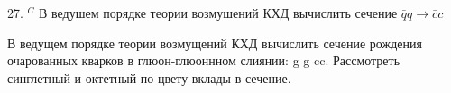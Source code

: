 \documentclass[a4paper,12pt]{article} %
\begin{document}
\begin{ttask}

27. $^{C}$ В ведушем порядке теории возмушений КХД вычислить сечение
$\bar{q} q \rightarrow \bar{c} c$


\end{ttask}



\begin{ttask}

В ведущем порядке теории возмущений КХД вычислить сечение рождения очарованных кварков в глюон-глюоннном слиянии: g g  cc. Рассмотреть синглетный и октетный по цвету вклады в сечение. 



















\end{ttask}





















\end{document}
